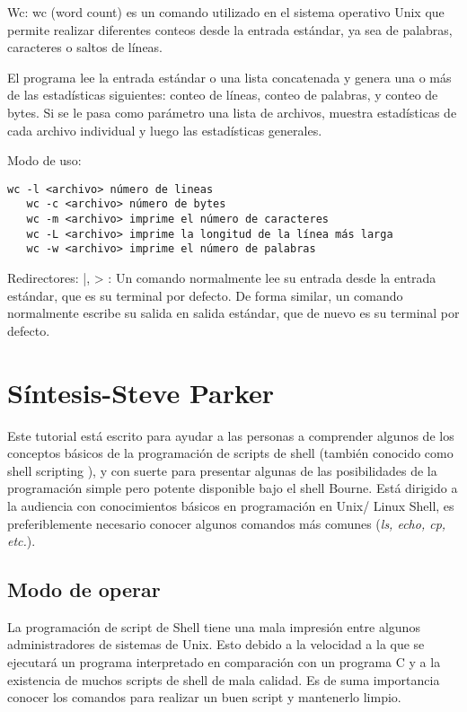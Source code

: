 \documentclass{article}
\begin{document}
\begin{itemize}
Wc: wc (word count) es un comando utilizado en el sistema operativo Unix que permite realizar diferentes conteos desde la entrada estándar, ya sea de palabras, caracteres o saltos de líneas.

El programa lee la entrada estándar o una lista concatenada y genera una o más de las estadísticas siguientes: conteo de líneas, conteo de palabras, y conteo de bytes. Si se le pasa como parámetro una lista de archivos, muestra estadísticas de cada archivo individual y luego las estadísticas generales.

Modo de uso:

\begin{verbatim}
wc -l <archivo> número de lineas
   wc -c <archivo> número de bytes
   wc -m <archivo> imprime el número de caracteres
   wc -L <archivo> imprime la longitud de la línea más larga
   wc -w <archivo> imprime el número de palabras
\end{verbatim}

Redirectores: |, > : Un comando normalmente lee su entrada desde la entrada estándar, que es su terminal por defecto. De forma similar, un comando normalmente escribe su salida en salida estándar, que de nuevo es su terminal por defecto.

\section{Síntesis-Steve Parker}

Este tutorial está escrito para ayudar a las personas a comprender algunos de los conceptos básicos de la programación de scripts de shell (también conocido como shell scripting ), y con suerte para presentar algunas de las posibilidades de la programación simple pero potente disponible bajo el shell Bourne. Está dirigido a la audiencia con conocimientos básicos en programación en Unix/ Linux Shell, es preferiblemente necesario conocer algunos comandos más comunes (\textit{ls, echo, cp, etc.}).

\subsection*{Modo de operar}
La programación de script de Shell tiene una mala impresión entre algunos administradores de sistemas de Unix. Esto debido a la velocidad a la que se ejecutará un programa interpretado en comparación con un programa C y a la existencia de muchos scripts de shell de mala calidad. Es de suma importancia conocer los comandos para realizar un buen script y mantenerlo limpio.


\end{itemize}
\end{document}
